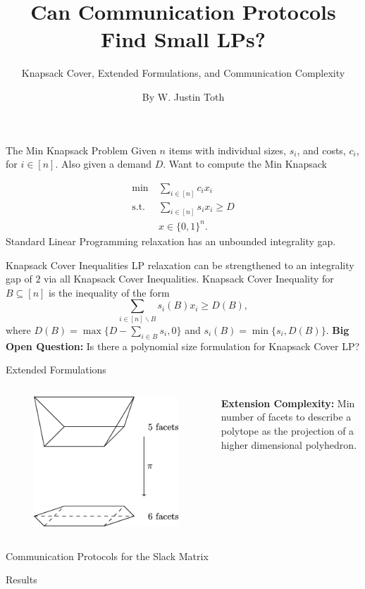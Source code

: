 \documentclass[10pt]{beamer}
\title{Can Communication Protocols Find Small LPs?}
\subtitle{Knapsack Cover, Extended Formulations, and Communication Complexity}
\date{}
\author{By W. Justin Toth}
\institute{CS860 - Communication Complexity}
\begin{document}
\maketitle

\begin{frame}{The Min Knapsack Problem}
Given $n$ items with individual sizes, $s_i$, and costs, $c_i$, for $i \in [n]$.
\vfill
Also given a demand $D$. Want to compute the \alert{Min Knapsack}

\begin{align*}
\min\ &\sum_{i\in [n]} c_i x_i \\
\text{s.t.} &\sum_{i \in [n]} s_i x_i \geq D \\
&x \in \{0,1\}^n.
\end{align*}
\vfill
Standard Linear Programming relaxation has an unbounded integrality gap.
\end{frame}
\begin{frame}{Knapsack Cover Inequalities}
LP relaxation can be strengthened to an integrality gap of $2$ via all Knapsack Cover Inequalities.
\vfill
Knapsack Cover Inequality for $B\subseteq [n]$ is the inequality of the form 
$$\sum_{i \in [n]\backslash B} s_i(B) x_i \geq D(B),$$
where $D(B) = \max\{D-\sum_{i\in B} s_i, 0\}$ and $s_i(B) = \min\{s_i, D(B)\}.$
\vfill
\textbf{Big Open Question:} Is there a polynomial size formulation for Knapsack Cover LP?
\end{frame}
\begin{frame}{Extended Formulations}
    \begin{columns}
        \begin{column}{0.5\textwidth}
    \begin{figure}
        \includegraphics[scale=0.075]{std_ex.png}
    \end{figure}
\end{column}
\begin{column}{0.5\textwidth}
\textbf{Extension Complexity:} Min number of facets to describe a polytope as the projection of a higher dimensional polyhedron.
\end{column}
\end{columns}
\end{frame}
\begin{frame}{Communication Protocols for the Slack Matrix}
\end{frame}
\begin{frame}{Results}
\end{frame}
\end{document}
